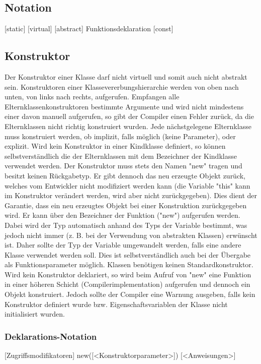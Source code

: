 \subsection{Notation}
[static] [virtual] [abstract] Funktionsdeklaration [const]

\subsection{Konstruktor}
Der Konstruktor einer Klasse darf nicht virtuell und somit auch nicht abstrakt sein.
Konstruktoren einer Klassevererbungshierarchie werden von oben nach unten, von links nach rechts, aufgerufen.
Empfangen alle Elternklassenkonstruktoren bestimmte Argumente und wird nicht mindestens einer davon manuell aufgerufen,
so gibt der Compiler einen Fehler zurück, da die Elternklassen nicht richtig konstruiert wurden.
Jede nächstgelegene Elternklasse muss konstruiert werden, ob implizit, falls möglich (keine Parameter), oder explizit.
Wird kein Konstruktor in einer Kindklasse definiert, so können selbstverständlich die der Elternklassen mit dem Bezeichner
der Kindklasse verwendet werden.
Der Konstruktor muss stets den Namen "new" tragen und besitzt keinen Rückgabetyp. Er gibt dennoch das neu erzeugte Objekt zurück,
welches vom Entwickler nicht modifiziert werden kann (die Variable "this" kann im Konstruktor verändert werden, wird aber nicht
zurückgegeben).
Dies dient der Garantie, dass ein neu erzeugtes Objekt bei einer Konstruktion zurückgegeben wird.
Er kann über den Bezeichner der Funktion ("new") aufgerufen werden.
Dabei wird der Typ automatisch anhand des Typs der Variable bestimmt, was jedoch nicht immer (z. B. bei der Verwendung von abstrakten Klassen) erwünscht ist. Daher sollte der Typ der Variable umgewandelt werden, falls eine andere Klasse verwendet werden soll.
Dies ist selbstverständlich auch bei der Übergabe als Funktionsparameter möglich.
Klassen benötigen keinen Standardkonstruktor. Wird kein Konstruktor deklariert, so wird beim Aufruf von "new" eine Funktion in einer höheren
Schicht (Compilerimplementation) aufgerufen und dennoch ein Objekt konstruiert. Jedoch sollte der Compiler eine Warnung ausgeben, falls kein
Konstruktor definiert wurde bzw. Eigenschaftsvariablen der Klasse nicht initialisiert wurden.

\subsubsection{Deklarations-Notation}
[Zugriffsmodifikatoren] new([<Konstruktorparameter>])
	[<Anweisungen>]

